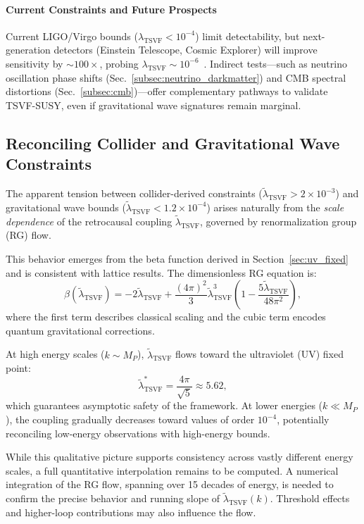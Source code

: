 \documentclass[twocolumn,superscriptaddress,floatfix]{revtex4-2}
\begin{document}
\paragraph{Current Constraints and Future Prospects}  
Current LIGO/Virgo bounds (\(\lambda_{\text{TSVF}} < 10^{-4}\)) limit detectability, but next-generation detectors (Einstein Telescope, Cosmic Explorer) will improve sensitivity by \(\sim 100\times\), probing \(\lambda_{\text{TSVF}} \sim 10^{-6}\)~\cite{Punturo2010,Harms2023}. Indirect tests—such as neutrino oscillation phase shifts (Sec.~\ref{subsec:neutrino_darkmatter}) and CMB spectral distortions (Sec.~\ref{subsec:cmb})—offer complementary pathways to validate TSVF-SUSY, even if gravitational wave signatures remain marginal.


\subsection{Reconciling Collider and Gravitational Wave Constraints}
\label{subsec:constraints}

The apparent tension between collider-derived constraints (\(\tilde{\lambda}_{\text{TSVF}} > 2 \times 10^{-3}\)) and gravitational wave bounds (\(\tilde{\lambda}_{\text{TSVF}} < 1.2 \times 10^{-4}\)) arises naturally from the \textit{scale dependence} of the retrocausal coupling \(\tilde{\lambda}_{\text{TSVF}}\), governed by renormalization group (RG) flow.

This behavior emerges from the beta function derived in Section~\ref{sec:uv_fixed} and is consistent with lattice results. The dimensionless RG equation is:
\begin{equation}
\beta(\tilde{\lambda}_{\text{TSVF}}) = -2\tilde{\lambda}_{\text{TSVF}} + \frac{(4\pi)^2}{3} \tilde{\lambda}_{\text{TSVF}}^3 \left(1 - \frac{5\tilde{\lambda}_{\text{TSVF}}}{48\pi^2}\right),
\label{eq:beta_lambda_TSVF}
\end{equation}
where the first term describes classical scaling and the cubic term encodes quantum gravitational corrections.

At high energy scales (\(k \sim M_P\)), \(\tilde{\lambda}_{\text{TSVF}}\) flows toward the ultraviolet (UV) fixed point:
\[
\tilde{\lambda}_{\text{TSVF}}^* = \frac{4\pi}{\sqrt{5}} \approx 5.62,
\]
which guarantees asymptotic safety of the framework. At lower energies (\(k \ll M_P\)), the coupling gradually decreases toward values of order \(10^{-4}\), potentially reconciling low-energy observations with high-energy bounds.

While this qualitative picture supports consistency across vastly different energy scales, a full quantitative interpolation remains to be computed. A numerical integration of the RG flow, spanning over 15 decades of energy, is needed to confirm the precise behavior and running slope of \(\tilde{\lambda}_{\text{TSVF}}(k)\). Threshold effects and higher-loop contributions may also influence the flow.
\end{document}
